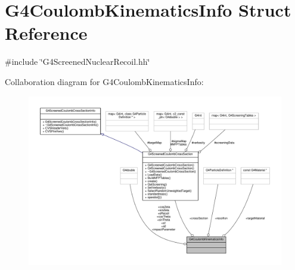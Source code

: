 \hypertarget{structG4CoulombKinematicsInfo}{}\section{G4\+Coulomb\+Kinematics\+Info Struct Reference}
\label{structG4CoulombKinematicsInfo}


{\ttfamily \#include \char`\"{}G4\+Screened\+Nuclear\+Recoil.\+hh\char`\"{}}



Collaboration diagram for G4\+Coulomb\+Kinematics\+Info\+:
\nopagebreak
\begin{figure}[H]
\begin{center}
\leavevmode
\includegraphics[width=350pt]{structG4CoulombKinematicsInfo__coll__graph}
\end{center}
\end{figure}
